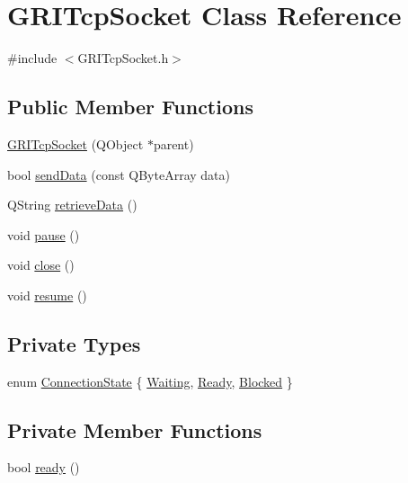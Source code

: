 \hypertarget{classGRITcpSocket}{\section{\-G\-R\-I\-Tcp\-Socket \-Class \-Reference}
\label{classGRITcpSocket}
}


{\ttfamily \#include $<$\-G\-R\-I\-Tcp\-Socket.\-h$>$}

\subsection*{\-Public \-Member \-Functions}
\begin{DoxyCompactItemize}
\item 
\hyperlink{classGRITcpSocket_aea0f8f15b96f6c5ecf5aa4b7459e19db}{\-G\-R\-I\-Tcp\-Socket} (\-Q\-Object $\ast$parent)
\item 
bool \hyperlink{classGRITcpSocket_a856d152f73347e16c2373dc14c980484}{send\-Data} (const \-Q\-Byte\-Array data)
\item 
\-Q\-String \hyperlink{classGRITcpSocket_aef69a50d65a987355587b222e2f04454}{retrieve\-Data} ()
\item 
void \hyperlink{classGRITcpSocket_a6fce833f6784fb277b0f471641fb3557}{pause} ()
\item 
void \hyperlink{classGRITcpSocket_ae08f2246ab5233240b08e5ca734a2c80}{close} ()
\item 
void \hyperlink{classGRITcpSocket_a32710b6bb52378ecfcd895388dfaca6c}{resume} ()
\end{DoxyCompactItemize}
\subsection*{\-Private \-Types}
\begin{DoxyCompactItemize}
\item 
enum \hyperlink{classGRITcpSocket_a443633117b63d3281a4247c244535f47}{\-Connection\-State} \{ \hyperlink{classGRITcpSocket_a443633117b63d3281a4247c244535f47a202f8ab58bcffce521b1681bb2f0a883}{\-Waiting}, 
\hyperlink{classGRITcpSocket_a443633117b63d3281a4247c244535f47af636091b023f6b6e79ffa0cb360b09b6}{\-Ready}, 
\hyperlink{classGRITcpSocket_a443633117b63d3281a4247c244535f47a3bd2f7c98edd887caa21de0ef5161f6b}{\-Blocked}
 \}
\end{DoxyCompactItemize}
\subsection*{\-Private \-Member \-Functions}
\begin{DoxyCompactItemize}
\item 
bool \hyperlink{classGRITcpSocket_a6e64e7feb07a18582d2963c7f0bb85e6}{ready} ()
\end{DoxyCompactItemize}

